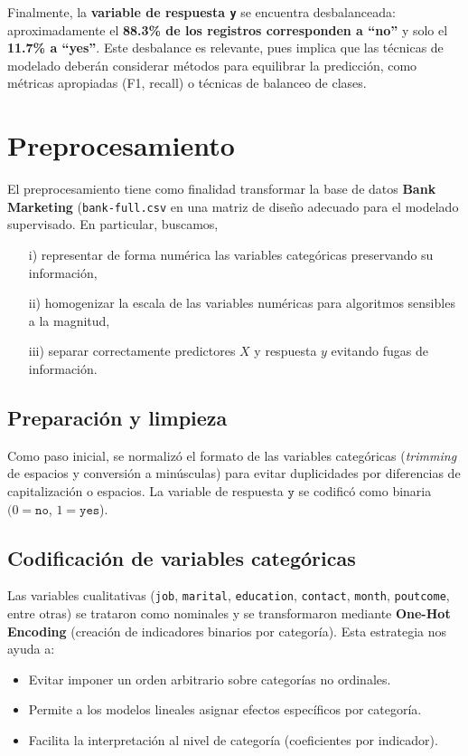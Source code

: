 \documentclass[10pt]{article}
\begin{document}
Finalmente, la \textbf{variable de respuesta \texttt{y}} se encuentra desbalanceada: aproximadamente el \textbf{88.3\% de los registros corresponden a ``no''} y solo el \textbf{11.7\% a ``yes''}. Este desbalance es relevante, pues implica que las técnicas de modelado deberán considerar métodos para equilibrar la predicción, como métricas apropiadas (F1, recall) o técnicas de balanceo de clases. 



\newpage
\section{Preprocesamiento}
El preprocesamiento tiene como finalidad transformar la base de datos \textbf{Bank Marketing} (\texttt{bank-full.csv} en una matriz de diseño adecuado para el modelado supervisado. En particular, buscamos, 
\begin{itemize}
    \item[i)] representar de forma numérica las variables categóricas preservando su información, 
    \item[ii)] homogenizar la escala de las variables numéricas para algoritmos sensibles a la magnitud, 
    \item[iii)] separar correctamente predictores $X$ y respuesta $y$ evitando fugas de información. 
\end{itemize}

\subsection*{Preparación y limpieza}
Como paso inicial, se normalizó el formato de las variables categóricas (\textit{trimming} de espacios y conversión a minúsculas) para evitar duplicidades por diferencias de capitalización o espacios. La variable de respuesta \(\texttt{y}\) se codificó como binaria $(0=\texttt{no}$, $1=\texttt{yes}$).

\subsection*{Codificación de variables categóricas}
Las variables cualitativas (\texttt{job}, \texttt{marital}, \texttt{education}, \texttt{contact}, \texttt{month}, \texttt{poutcome}, entre otras) se trataron como nominales y se transformaron mediante \textbf{One-Hot Encoding} (creación de indicadores binarios por categoría). Esta estrategia nos ayuda a:  
\begin{itemize}
    \item Evitar imponer un orden arbitrario sobre categorías no ordinales.
    \item Permite a los modelos lineales asignar efectos específicos por categoría.
    \item Facilita la interpretación al nivel de categoría (coeficientes por indicador).
\end{itemize}
\end{document}
